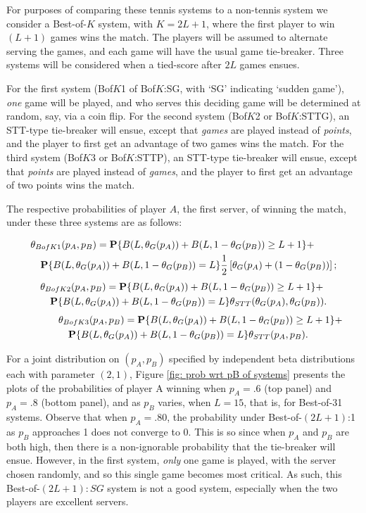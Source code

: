 \documentclass[11pt]{article}
\theoremstyle{plain}
\theoremstyle{definition}
\renewcommand{\Pr}{\mathbf{P}}
\begin{document}
For purposes of comparing these tennis systems to a non-tennis system we consider a Best-of-$K$ system, with $K=2L+1$, where the first player to win $(L+1)$ games wins the match. The players will be assumed to alternate serving the games, and each game will have the usual game tie-breaker. Three systems will be considered when a tied-score after $2L$ games ensues.

For the first system (Bof$K$1 of Bof$K$:SG, with `SG' indicating `sudden game'), {\em one} game will be played, and who serves this deciding game will be determined at random, say, via a coin flip.
%
For the second system (Bof$K$2 or Bof$K$:STTG), an STT-type tie-breaker will ensue, except that {\em games} are played instead of {\em points}, and the player to first get an advantage of two games wins the match. 
%
For the third system (Bof$K$3 or Bof$K$:STTP), an STT-type tie-breaker will ensue, except that {\em points} are played instead of {\em games}, and the player to first get an advantage of two points wins the match. 

The respective probabilities of player $A$, the first server, of winning the match, under these three systems are as follows:

\begin{eqnarray*}
\lefteqn{ \theta_{BofK1}(p_A,p_B)  =  
 \Pr\{B(L,\theta_G(p_A)) + B(L,1-\theta_G(p_B)) \ge L+1\} + } \\ &&
 \Pr\{B(L,\theta_G(p_A)) + B(L,1-\theta_G(p_B)) = L\}
 \frac{1}{2} \left[\theta_G(p_A) + (1-\theta_G(p_B))\right];
\end{eqnarray*}
%
\begin{eqnarray*}
 \lefteqn{ \theta_{BofK2}(p_A,p_B)  =  
 \Pr\{B(L,\theta_G(p_A)) + B(L,1-\theta_G(p_B)) \ge L+1\} + }\\ &&
 \Pr\{B(L,\theta_G(p_A)) + B(L,1-\theta_G(p_B)) = L\}
 \theta_{STT}(\theta_G(p_A),\theta_G(p_B)).
\end{eqnarray*}
%
\begin{eqnarray*}
\lefteqn{ \theta_{BofK3}(p_A,p_B)  =  
 \Pr\{B(L,\theta_G(p_A)) + B(L,1-\theta_G(p_B)) \ge L+1\} + } \\ &&
 \Pr\{B(L,\theta_G(p_A)) + B(L,1-\theta_G(p_B)) = L\}
 \theta_{STT}(p_A,p_B).
\end{eqnarray*}

For a joint distribution on $(p_A,p_B)$ specified by independent beta distributions each with parameter $(2,1)$, Figure \ref{fig: prob wrt pB of systems} presents the plots of the probabilities of player A winning when $p_A=.6$ (top panel) and $p_A=.8$ (bottom panel), and as $p_B$ varies, when $L = 15$, that is, for Best-of-31 systems. Observe that when $p_A = .80$, the probability under Best-of-$(2L+1)$:1 as $p_B$ approaches 1 does not converge to 0. This is so since when $p_A$ and $p_B$ are both high, then there is a non-ignorable probability that the tie-breaker will ensue. However, in the first system, {\em only} one game is played, with the server chosen randomly, and so this single game becomes most critical. As such, this Best-of-$(2L+1):SG$ system is not a good system, especially when the two players are excellent servers.
\end{document}
